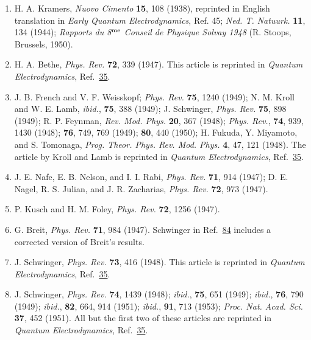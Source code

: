 \begin{enumerate}
\item[79a.]\label{ref:1.79a} H. A. Kramers, \emph{Nuovo Cimento} \textbf{15}, 108 (1938),
reprinted in English translation in \emph{Early Quantum Electrodynamics}, Ref.
45; \emph{Ned. T. Natuurk.} \textbf{11}, 134 (1944); \emph{Rapports du 8$^{\rm
me}$ Conseil de Physique Solvay 1948} (R. Stoops, Brussels, 1950).

\item\label{ref:1.80} H. A. Bethe, \emph{Phys. Rev.} \textbf{72}, 339 (1947). This article is
reprinted in \emph{Quantum Electrodynamics}, Ref.~\hyperref[ref:1.35]{35}.

\item\label{ref:1.81} J. B. French and V. F. Weisskopf; \emph{Phys. Rev.} \textbf{75}, 1240
(1949); N. M. Kroll and W. E. Lamb, \emph{ibid.}, \textbf{75}, 388 (1949); J.
Schwinger, \emph{Phys. Rev.} \textbf{75}, 898 (1949); R. P. Feynman,
\emph{Rev. Mod. Phys.} \textbf{20}, 367 (1948); \emph{Phys. Rev.}, \textbf{74},
939, 1430 (1948); \textbf{76}, 749, 769 (1949); \textbf{80}, 440 (1950); H.
Fukuda, Y. Miyamoto, and S. Tomonaga, \emph{Prog. Theor. Phys. Rev. Mod.
Phys.} \textbf{4}, 47, 121 (1948). The article by Kroll and Lamb is reprinted
in \emph{Quantum Electrodynamics}, Ref.~\hyperref[ref:1.35]{35}.

\item\label{ref:1.82} J. E. Nafe, E. B. Nelson, and I. I. Rabi, \emph{Phys. Rev.} \textbf{71},
914 (1947); D. E. Nagel, R. S. Julian, and J. R. Zacharias, \emph{Phys. Rev.}
\textbf{72}, 973 (1947).

\item\label{ref:1.83} P. Kusch and H. M. Foley, \emph{Phys. Rev.} \textbf{72}, 1256 (1947).

\item[83a.]\label{ref:1.83a} G. Breit, \emph{Phys. Rev.} \textbf{71}, 984 (1947). Schwinger in
Ref.~\hyperref[ref:1.84]{84} includes a corrected version of Breit's results.

\item\label{ref:1.84} J. Schwinger, \emph{Phys. Rev.} \textbf{73}, 416 (1948). This article
is reprinted in \emph{Quantum Electrodynamics}, Ref.~\hyperref[ref:1.35]{35}.

\item\label{ref:1.85} J. Schwinger, \emph{Phys. Rev.} \textbf{74}, 1439 (1948); \emph{ibid.},
\textbf{75}, 651 (1949); \emph{ibid.}, \textbf{76}, 790 (1949); \emph{ibid.},
\textbf{82}, 664, 914 (1951); \emph{ibid.}, \textbf{91}, 713 (1953); \emph{Proc.
Nat. Acad. Sci.} \textbf{37}, 452 (1951). All but the first two of these
articles are reprinted in \emph{Quantum Electrodynamics}, Ref.~\hyperref[ref:1.35]{35}.


\end{enumerate}
